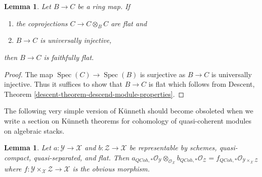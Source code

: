\documentclass{stacks-project}
\theoremstyle{plain}
\newtheorem{lemma}[subsection]{Lemma}
\theoremstyle{definition}
\theoremstyle{remark}
\numberwithin{equation}{subsection}
\def\Spec{\mathop{\mathrm{Spec}}}
\def\QCoh{\mathit{QCoh}}
\begin{document}
\begin{lemma}
\label{lemma-flat}
Let $B \to C$ be a ring map. If
\begin{enumerate}
\item the coprojections $C \to C \otimes_B C$ are flat and
\item $B \to C$ is universally injective,
\end{enumerate}
then $B \to C$ is faithfully flat.
\end{lemma}

\begin{proof}
The map $\Spec(C) \to \Spec(B)$ is surjective as $B \to C$ is universally
injective. Thus it suffices to show that $B \to C$ is flat
which follows from
Descent, Theorem \ref{descent-theorem-descend-module-properties}.
\end{proof}

\noindent
The following very simple version of K\"unneth should become
obsoleted when we write a section on K\"unneth theorems for
cohomology of quasi-coherent modules on algebraic stacks.

\begin{lemma}
\label{lemma-easy-kunneth}
Let $a : \mathcal{Y} \to \mathcal{X}$ and $b : \mathcal{Z} \to \mathcal{X}$
be representable by schemes, quasi-compact, quasi-separated, and flat.
Then $a_{\QCoh, *}\mathcal{O}_\mathcal{Y}
\otimes_{\mathcal{O}_\mathcal{X}}
b_{\QCoh, *}\mathcal{O}_\mathcal{Z} =
f_{\QCoh, *}\mathcal{O}_{\mathcal{Y} \times_\mathcal{X} \mathcal{Z}}$
where $f : \mathcal{Y} \times_\mathcal{X} \mathcal{Z} \to \mathcal{X}$
is the obvious morphism.
\end{lemma}
\end{document}
